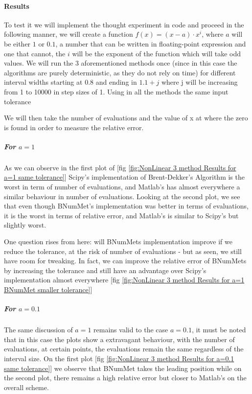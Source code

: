 \paragraph{Results}
To test it we will implement the thought experiment in code and proceed in the following manner, we will create a function $f(x) = (x-a)\cdot x^{i}$, where $a$ will be either $1$ or $0.1$, a number that can be written in floating-point expression and one that cannot, the $i$ will be the exponent of the function which will take odd values. We will run the 3 aforementioned methods once (since in this case the algorithms are purely deterministic, as they do not rely on time) for different interval widths starting at $0.8$ and ending in $1.1+j$ where j will be increasing from 1 to 10000 in step sizes of 1. Using in all the methods the same input tolerance

We will then take the number of evaluations and the value of x at where the zero is found in order to measure the relative error.

\subparagraph{For $a=1$}
As we can observe in the first plot of [fig \ref{fig:NonLinear 3 method Results for a=1 same tolerance}] Scipy's implementation of Brent-Dekker's Algorithm is the worst in term of number of evaluations, and Matlab's has almost everywhere a similar behaviour in number of evaluations. Looking at the second plot, we see that even though BNumMet's implementation was better in terms of evaluations, it is the worst in terms of relative error, and Matlab's is similar to Scipy's but slightly worst.

One question rises from here: will BNumMets implementation improve if we reduce the tolerance, at the risk of number of evaluations - but as seen, we still have room for tweaking. In fact, we can improve the relative error of BNumMets by increasing the tolerance and still have an advantage over Scipy's implementation almost everywhere [fig \ref{fig:NonLinear 3 method Results for a=1 BNumMet smaller tolerance}]

\subparagraph{For $a=0.1$}
The same discussion of $a=1$ remains valid to the case $a=0.1$, it must be noted that in this case the plots show a extravagant behaviour, with the number of evaluations, at certain points, the evaluations remain the same regardless of the interval size. On the first plot [fig \ref{fig:NonLinear 3 method Results for a=0.1 same tolerance}] we observe that BNumMet takes the leading position while on the second plot, there remains a high relative error but closer to Matlab's on the overall scheme.

